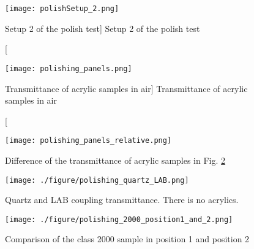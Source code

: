 \begin{figure}
    \label{fig:polishSetup_2}
    \centering
    \texttt{[image: polishSetup\_2.png]}
    \caption
    [Setup 2 of the polish test]
    {Setup 2 of the polish test}
    \end{figure}


%
%




\begin{figure} 
    \label{fig:polishing_panels}
    \centering
    \texttt{[image: polishing\_panels.png]}
    \caption
    [Transmittance of acrylic samples in air]
    {Transmittance of acrylic samples in air}
    \end{figure}



\begin{figure}
    \centering
    \texttt{[image: polishing\_panels\_relative.png]}
    \caption{Difference of the transmittance of acrylic samples in Fig. \ref{fig:polishing_panels}}
    \label{fig:polishing_panels_relative}
    \end{figure}


\begin{figure}
    \centering
    \texttt{[image: ./figure/polishing\_quartz\_LAB.png]}
    \caption{Quartz and LAB coupling transmittance. There is no acrylics.}
    \label{fig:polishing_quartz_LAB}
    \end{figure}



\begin{figure}
    \centering
    \texttt{[image: ./figure/polishing\_2000\_position1\_and\_2.png]}
    \caption{Comparison of the class 2000 sample in position 1 and position 2}
    \label{fig:polishing_2000_position1_and_2}
    \end{figure}



